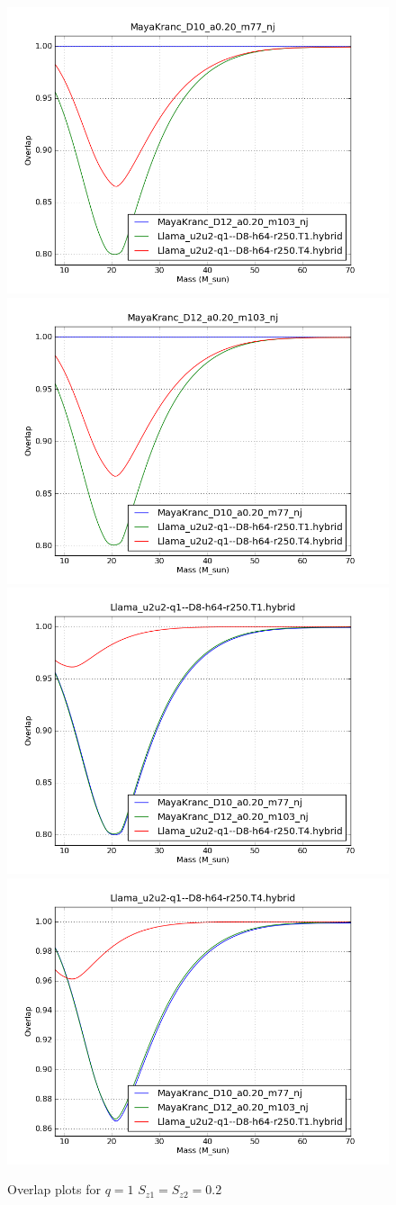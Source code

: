 \begin{figure}
  \includegraphics[width=0.5\linewidth]{figures/ninja2/figure_1_0d2_03.png} 
  \includegraphics[width=0.5\linewidth]{figures/ninja2/figure_1_0d2_06.png} \\
  \includegraphics[width=0.5\linewidth]{figures/ninja2/figure_1_0d2_09.png} 
  \includegraphics[width=0.5\linewidth]{figures/ninja2/figure_1_0d2_12.png} \\
  \caption[Overlap plots for $q=1$ $S_{z1} = S_{z2} = 0.2$]{
  \label{f:figure_1_0d2}
Overlap plots for $q=1$ $S_{z1} = S_{z2} = 0.2$}
\end{figure}%


